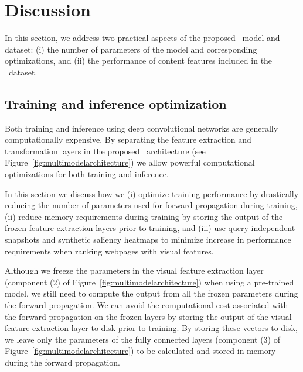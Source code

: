 
\section{Discussion}
\label{sec:discussion}
In this section, we address two practical aspects of the proposed \modelname~model and dataset:
(i) the number of parameters of the \modelname{} model and corresponding optimizations, and
(ii) the performance of content features included in the \datasetname~dataset.


\subsection{Training and inference optimization} \label{sec:sectionoptimalization}
Both training and inference using deep convolutional networks are generally computationally expensive.
By separating the feature extraction and transformation layers in the proposed \modelname~architecture (see Figure~\ref{fig:multimodelarchitecture}) we allow powerful computational optimizations for both training and inference. 

In this section we discuss how we 
(i) optimize training performance by drastically reducing the number of parameters used for forward propagation during training, 
(ii) reduce memory requirements during training by storing the output of the frozen feature extraction layers prior to training, and
(iii) use query-independent snapshots and synthetic saliency heatmaps to minimize increase in performance requirements when ranking webpages with visual features.
\fi

Although we freeze the parameters in the visual feature extraction layer (component (2) of Figure~\ref{fig:multimodelarchitecture}) when using a pre-trained model, we still need to compute the output from all the frozen parameters during the forward propagation.
We can avoid the computational cost associated with the forward propagation on the frozen layers by storing the output of the visual feature extraction layer to disk prior to training.
By storing these vectors to disk, we leave only the parameters of the fully connected layers (component (3) of Figure~\ref{fig:multimodelarchitecture}) to be calculated and stored in memory during the forward propagation. 

